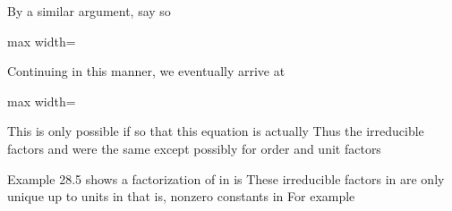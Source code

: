 \documentclass[11pt,oneside]{article}
\begin{document}
\begin{BookBody}
\noindent By a similar argument, say  so

\begin{center}\begin{adjustbox}{max width=\linewidth}\end{adjustbox}\end{center}

\noindent Continuing in this manner, we eventually arrive at

\begin{center}\begin{adjustbox}{max width=\linewidth}\end{adjustbox}\end{center}

\noindent This is only possible if  so that this equation is actually  Thus the irreducible factors  and  were the same except possibly for order and unit factors\BookEnd{\blacklozenge}

 Example 28.5 shows a factorization of  in  is  These irreducible factors in  are only unique up to units in  that is, nonzero constants in  For example\BookEnd{\blacktriangle}

\end{BookBody}

\BookNarrativefalse
\end{document}
